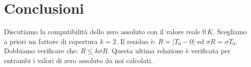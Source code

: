 \section{Conclusioni}
Discutiamo la compatibilità dello zero assoluto con il valore reale $0\, K$. Scegliamo a priori un fattore di copertura $k=2$. Il residuo è:
$R= |T_0-0|$ ed $\sigma R = \sigma T_0$. Dobbiamo verificare che: $R\leq k\sigma R$. Questa ultima relazione è verificata per entrambi i valori di zero assoluto da noi calcolati.
